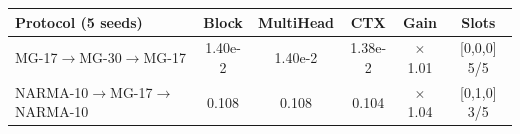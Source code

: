 \begin{tabular}{lccccc}
\toprule
Protocol (5 seeds) & Block & MultiHead & CTX & Gain & Slots \\
\midrule
MG-17$\to$MG-30$\to$MG-17 & 1.40e-2 & 1.40e-2 & 1.38e-2 & $\times$1.01 & [0,0,0] 5/5 \\
NARMA-10$\to$MG-17$\to$NARMA-10 & 0.108 & 0.108 & 0.104 & $\times$1.04 & [0,1,0] 3/5 \\
\bottomrule
\end{tabular}